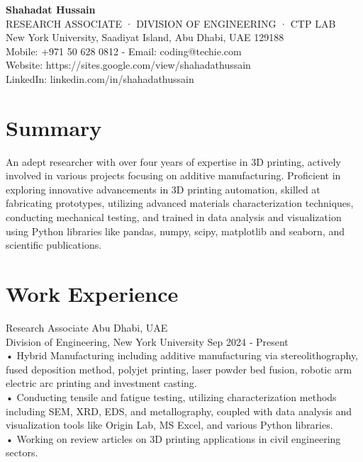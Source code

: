 \documentclass[a4paper]{article}
\begin{document}
\begin{center}

\textbf{\LARGE Shahadat Hussain}\\

RESEARCH ASSOCIATE · DIVISION OF ENGINEERING · CTP LAB\\
New York University, Saadiyat Island, Abu Dhabi, UAE 129188\\

Mobile: +971 50 628 0812 - Email: coding@techie.com\\
Website: https://sites.google.com/view/shahadathussain\\
LinkedIn: linkedin.com/in/shahadathussain\\

\end{center}

\section*{Summary}
An adept researcher with over four years of expertise in 3D printing, actively involved in various projects focusing on additive
manufacturing. Proficient in exploring innovative advancements in 3D printing automation, skilled at fabricating
prototypes, utilizing advanced materials characterization techniques, conducting mechanical testing, and trained in
data analysis and visualization using Python libraries like pandas, numpy, scipy, matplotlib and seaborn, and scientific
publications.\\

\section*{Work Experience}
Research Associate Abu Dhabi, UAE\\
Division of Engineering, New York University Sep 2024 ‑ Present\\
• Hybrid Manufacturing including additive manufacturing via stereolithography, fused deposition method, polyjet
printing, laser powder bed fusion, robotic arm electric arc printing and investment casting.\\
• Conducting tensile and fatigue testing, utilizing characterization methods including SEM, XRD, EDS, and metallography,
coupled with data analysis and visualization tools like Origin Lab, MS Excel, and various Python libraries.\\
• Working on review articles on 3D printing applications in civil engineering sectors.\\
\end{document}
